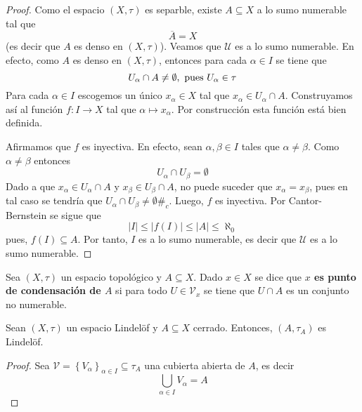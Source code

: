 \documentclass[12pt]{report}
\theoremstyle{largebreak}
\newcommand\abs[1]{\ensuremath{\left|#1\right|}}
\newcommand\cf[3]{\ensuremath{#1:#2\rightarrow#3}}
\newcommand\contradiction{\ensuremath{\#_c}}
\newcommand{\Cls}[1]{\ensuremath{\overline{#1}}}
\begin{document}
    \begin{proof}
        Como el espacio $(X,\tau)$ es separble, existe $A\subseteq X$ a lo sumo numerable tal que
        \begin{equation*}
            \Cls{A}=X
        \end{equation*}
        (es decir que $A$ es denso en $(X,\tau)$). Veamos que $\mathcal{U}$ es a lo sumo numerable. En efecto, como $A$ es denso en $(X,\tau)$, entonces para cada $\alpha\in I$ se tiene que
        \begin{equation*}
            U_\alpha\cap A\neq\emptyset, \textup{ pues }U_\alpha\in\tau
        \end{equation*}
        Para cada $\alpha\in I$ escogemos un único $x_\alpha\in X$ tal que $x_\alpha\in U_\alpha\cap A$. Construyamos así al función $\cf{f}{I}{X}$ tal que $\alpha\mapsto x_\alpha$. Por construcción esta función está bien definida.

        Afirmamos que $f$ es inyectiva. En efecto, sean $\alpha,\beta\in I$ tales que $\alpha\neq\beta$. Como $\alpha\neq\beta$ entonces
        \begin{equation*}
            U_\alpha\cap U_\beta=\emptyset
        \end{equation*}
        Dado a que $x_\alpha\in U_\alpha\cap A$ y $x_\beta\in U_\beta\cap A$, no puede suceder que $x_\alpha=x_\beta$, pues en tal caso se tendría que $U_\alpha\cap U_\beta\neq\emptyset$\contradiction. Luego, $f$ es inyectiva. Por Cantor-Bernstein se sigue que
        \begin{equation*}
            \abs{I}\leq\abs{f(I)}\leq\abs{A}\leq\aleph_0
        \end{equation*}
        pues, $f(I)\subseteq A$. Por tanto, $I$ es a lo sumo numerable, es decir que $\mathcal{U}$ es a lo sumo numerable.
    \end{proof}

    \begin{mydef}
        Sea $(X,\tau)$ un espacio topológico y $A\subseteq X$. Dado $x\in X$ se dice que \textbf{$x$ es punto de condensación de $A$} si para todo $U\in\mathcal{V}_x$ se tiene que $U\cap A$ es un conjunto no numerable.
    \end{mydef}

    \begin{propo}
        Sean $(X,\tau)$ un espacio Lindelöf y $A\subseteq X$ cerrado. Entonces, $(A,\tau_A)$ es Lindelöf.
    \end{propo}

    \begin{proof}
        Sea $\mathcal{V}=\left\{V_\alpha\right\}_{\alpha\in I}\subseteq\tau_A$ una cubierta abierta de $A$, es decir
        \begin{equation*}
            \bigcup_{\alpha\in I}V_\alpha=A
        \end{equation*}
    \end{proof}
\end{document}

